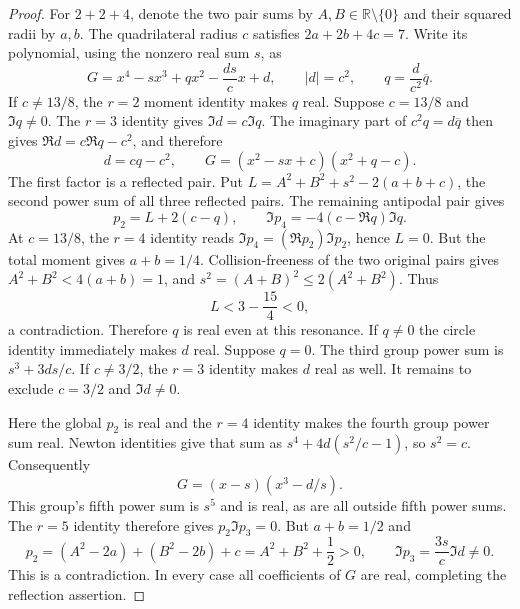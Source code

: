 \documentclass[11pt]{article}
\theoremstyle{remark}
\numberwithin{equation}{section}
\begin{document}
\begin{proof}
For $2+2+4$, denote the two pair sums by $A,B\in\mathbb R\setminus
\{0\}$ and their squared radii by $a,b$. The quadrilateral radius
$c$ satisfies $2a+2b+4c=7$. Write its polynomial, using the
nonzero real sum $s$, as
\[
 G=x^4-sx^3+q x^2-\frac{ds}{c}x+d,\qquad |d|=c^2,\qquad
                      q=\frac d{c^2}\overline q.
\]
If $c\ne13/8$, the $r=2$ moment identity makes $q$ real.
Suppose $c=13/8$ and $\Im q\ne0$. The $r=3$ identity gives
$\Im d=c\Im q$. The imaginary part of
$c^2q=d\overline q$ then gives $\Re d=c\Re q-c^2$, and therefore
\[
 d=cq-c^2,\qquad G=(x^2-sx+c)(x^2+q-c).
\]
The first factor is a reflected pair. Put
$L=A^2+B^2+s^2-2(a+b+c)$, the second power sum of all three
reflected pairs. The remaining antipodal pair gives
\[
 p_2=L+2(c-q),\qquad \Im p_4=-4(c-\Re q)\Im q.
\]
At $c=13/8$, the $r=4$ identity reads
$\Im p_4=(\Re p_2)\Im p_2$, hence $L=0$.
But the total moment gives $a+b=1/4$. Collision-freeness of the
two original pairs gives $A^2+B^2<4(a+b)=1$, and
$s^2=(A+B)^2\le2(A^2+B^2)$. Thus
\[
                     L<3-\frac{15}{4}<0,
\]
a contradiction. Therefore $q$ is real even at this resonance.
If $q\ne0$ the circle
identity immediately makes $d$ real. Suppose $q=0$.
The third group power sum is $s^3+3ds/c$. If $c\ne3/2$, the
$r=3$ identity makes $d$ real as well. It remains to exclude
$c=3/2$ and $\Im d\ne0$.

Here the global $p_2$ is real and the $r=4$ identity makes the fourth
group power sum real. Newton identities give that sum as
$s^4+4d(s^2/c-1)$, so $s^2=c$. Consequently
\[
                       G=(x-s)(x^3-d/s).
\]
This group's fifth power sum is $s^5$ and is real, as are all
outside fifth power sums. The $r=5$ identity therefore gives
$p_2\Im p_3=0$. But $a+b=1/2$ and
\[
 p_2=(A^2-2a)+(B^2-2b)+c=A^2+B^2+\frac12>0,
 \qquad \Im p_3=\frac{3s}{c}\Im d\ne0.
\]
This is a contradiction. In every case all coefficients of $G$ are
real, completing the reflection assertion.
\end{proof}
\end{document}
